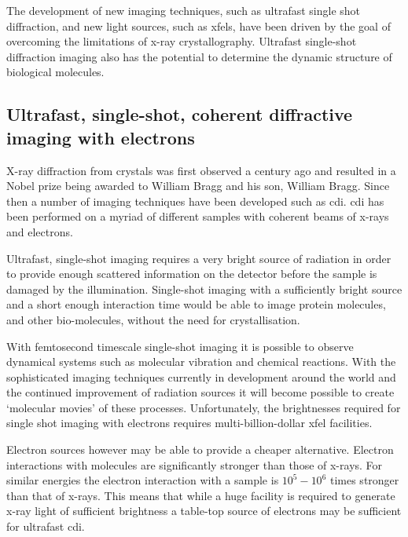 The development of new imaging techniques, such as ultrafast single shot diffraction, and new light sources, such as \glspl{xfel}, have been driven by the goal of overcoming the limitations of x-ray crystallography. Ultrafast single-shot diffraction imaging also has the potential to determine the dynamic structure of biological molecules.


\subsection{Ultrafast, single-shot, coherent diffractive imaging with electrons}

X-ray diffraction from crystals was first observed a century ago\cite{bragg_x-rays_1912} and resulted in a Nobel prize being awarded to William Bragg and his son, William Bragg. Since then a number of imaging techniques have been developed such as \gls{cdi}. \Gls{cdi} has been performed on a myriad of different samples with coherent beams of x-rays and electrons.

Ultrafast, single-shot imaging requires a very bright source of radiation in order to provide enough scattered information on the detector before the sample is damaged by the illumination\cite{henderson_potential_1995}. Single-shot imaging with a sufficiently bright source and a short enough interaction time would be able to image protein molecules, and other bio-molecules, without the need for crystallisation\cite{neutze_potential_2000}.

With femtosecond timescale single-shot imaging it is possible to observe dynamical systems such as molecular vibration and chemical reactions\cite{zewail_4d_2006}. With the sophisticated imaging techniques currently in development around the world and the continued improvement of radiation sources it will become possible to create `molecular movies'\cite{dwyer_femtosecond_2006} of these processes. Unfortunately, the brightnesses required for single shot imaging with electrons requires multi-billion-dollar \gls{xfel} facilities.

Electron sources however may be able to provide a cheaper alternative. Electron interactions with molecules are significantly stronger than those of x-rays. For similar energies the electron interaction with a sample is $10^5-10^6$ times stronger than that of x-rays\cite{sciaini_femtosecond_2011}. This means that while a huge facility is required to generate x-ray light of sufficient brightness a table-top source of electrons may be sufficient for ultrafast \gls{cdi}.

